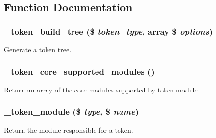 \subsection{Function Documentation}
\hypertarget{token_8module_aa6e563e68ab48c3388196821fe733f1b}{
\subsubsection[{\_\-token\_\-build\_\-tree}]{\setlength{\rightskip}{0pt plus 5cm}\_\-token\_\-build\_\-tree (\$ {\em token\_\-type}, \/  array \$ {\em options})}}
\label{token_8module_aa6e563e68ab48c3388196821fe733f1b}
Generate a token tree. \hypertarget{token_8module_a52a0e3627b37ebbaee0da2b2ac985cf5}{
\subsubsection[{\_\-token\_\-core\_\-supported\_\-modules}]{\setlength{\rightskip}{0pt plus 5cm}\_\-token\_\-core\_\-supported\_\-modules ()}}
\label{token_8module_a52a0e3627b37ebbaee0da2b2ac985cf5}
Return an array of the core modules supported by \hyperlink{token_8module}{token.module}. \hypertarget{token_8module_aec2b84752434d0daf6ff455a1f523f51}{
\subsubsection[{\_\-token\_\-module}]{\setlength{\rightskip}{0pt plus 5cm}\_\-token\_\-module (\$ {\em type}, \/  \$ {\em name})}}
\label{token_8module_aec2b84752434d0daf6ff455a1f523f51}
Return the module responsible for a token.


